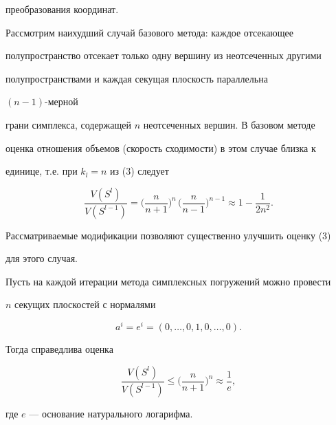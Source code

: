 преобразования координат.





Рассмотрим наихудший случай базового метода: каждое отсекающее


полупространство отсекает только одну вершину из неотсеченных другими


полупространствами и каждая секущая плоскость параллельна


$(n-1)$-мерной


грани симплекса, содержащей $n$ неотсеченных вершин. В базовом методе


оценка отношения объемов (скорость сходимости) в этом случае близка к


единице, т.е. при $k_l=n$ из (3) следует


$$


\frac{V(S^l)}{V(S^{l-1})}=\biggl(\frac{n}{n+1}\biggr)^n\,


\biggl(\frac{n}{n-1}\biggr)^{n-1}\approx 1-\frac{1}{2n^2}.


$$





Рассматриваемые модификации позволяют существенно улучшить оценку (3)


для этого случая.





\begin{thm}


Пусть на каждой итерации метода симплексных погружений можно провести


$n$ секущих плоскостей с нормалями


\begin{equation}


a^i=e^i=(0,\dotsc,0,1,0,\dotsc,0).


\end{equation}


Тогда справедлива оценка


\begin{equation}


\frac{V(S^l)}{V(S^{l-1})}\le\biggl(\frac{n}{n+1}\biggr)^n


\approx\frac{1}{e},


\end{equation}


где $e$ --- основание натурального логарифма.


\end{thm}





